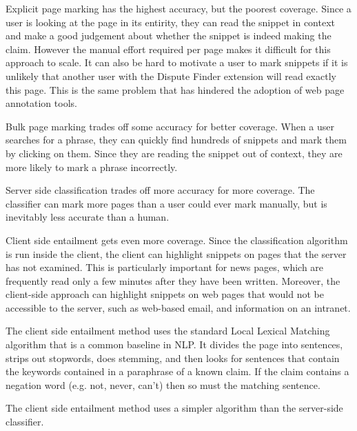 \documentclass{www2010-submission}
\newcommand{\todo}[1]{}
\begin{document}
Explicit page marking has the highest accuracy, but the poorest coverage. Since a user is looking at the page in its entirity, they can read the snippet in context and make a good judgement about whether the snippet is indeed making the claim. However the manual effort required per page makes it difficult for this approach to scale. It can also be hard to motivate a user to mark snippets if it is unlikely that another user with the Dispute Finder extension will read exactly this page. This is the same problem that has hindered the adoption of web page annotation tools.

Bulk page marking trades off some accuracy for better coverage. When a user searches for a phrase, they can quickly find hundreds of snippets and mark them by clicking on them. Since they are reading the snippet out of context, they are more likely to mark a phrase incorrectly. 

Server side classification trades off more accuracy for more coverage. The classifier can mark more pages than a user could ever mark manually, but is inevitably less accurate than a human.

Client side entailment gets even more coverage. Since the classification algorithm is run inside the client, the client can highlight snippets on pages that the server has not examined. This is particularly important for news pages, which are frequently read only a few minutes after they have been written. Moreover, the client-side approach can highlight snippets on web pages that would not be accessible to the server, such as web-based email, and information on an intranet.

The client side entailment method uses the standard Local Lexical Matching algorithm that is a common baseline in NLP. It divides the page into sentences, strips out stopwords, does stemming, and then looks for sentences that contain the keywords contained in a paraphrase of a known claim. If the claim contains a negation word (e.g. not, never, can't) then so must the matching sentence.

\todo{Discuss how and why this is simpler than the server-side classification method}
\todo{Explain how we avoid downloading the entire database}


The client side entailment method uses a simpler algorithm than the server-side classifier. 



\todo{Should we have a version where the interface merely suggests n-grams that should be used by the classifier}
\todo{Can we present all these systems without giving detailed stats about how they compare?}
\todo{Add support for a user to enter 'anti-phrases' when a snippet is wrongly highlighted}
\todo{Add support for a user to enter a paraphrase that will match the snippet they are looking at}
\todo{Do a load more people in a final user-study round. Try to get it up to 8.}
\todo{Explain how our algorithm relates to existing NLP work - due to unusual domain}
\end{document}
